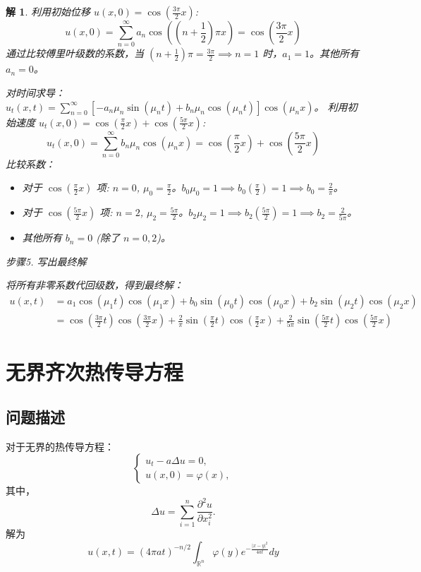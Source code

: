 \documentclass[12pt,a4paper]{article}
\numberwithin{subsection}{section}
\numberwithin{subsubsection}{subsection}
\theoremstyle{plain}
\newtheorem{solution}{解}[subsection]
\theoremstyle{definition}
\theoremstyle{remark}
\begin{document}
\begin{solution}
		\noindent
		利用初始位移 $u(x,0) = \cos(\frac{3\pi}{2}x)$:
		\[ u(x,0) = \sum_{n=0}^\infty a_n \cos\left((n+\frac{1}{2})\pi x\right) = \cos\left(\frac{3\pi}{2}x\right) \]
		通过比较傅里叶级数的系数，当 $(n+\frac{1}{2})\pi = \frac{3\pi}{2} \implies n=1$ 时，$a_1=1$。其他所有 $a_n=0$。
		
		\noindent
		对时间求导：$u_t(x,t) = \sum_{n=0}^\infty \left[-a_n\mu_n \sin(\mu_n t) + b_n\mu_n \cos(\mu_n t)\right] \cos(\mu_n x)$。
		利用初始速度 $u_t(x,0) = \cos(\frac{\pi}{2}x) + \cos(\frac{5\pi}{2}x)$:
		\[ u_t(x,0) = \sum_{n=0}^\infty b_n\mu_n \cos(\mu_n x) = \cos\left(\frac{\pi}{2}x\right) + \cos\left(\frac{5\pi}{2}x\right) \]
		比较系数：
		\begin{itemize}
			\item 对于 $\cos(\frac{\pi}{2}x)$ 项: $n=0$, $\mu_0=\frac{\pi}{2}$。$b_0\mu_0 = 1 \implies b_0\left(\frac{\pi}{2}\right)=1 \implies b_0 = \frac{2}{\pi}$。
			\item 对于 $\cos(\frac{5\pi}{2}x)$ 项: $n=2$, $\mu_2=\frac{5\pi}{2}$。$b_2\mu_2 = 1 \implies b_2\left(\frac{5\pi}{2}\right)=1 \implies b_2 = \frac{2}{5\pi}$。
			\item 其他所有 $b_n=0$ (除了 $n=0,2$)。
		\end{itemize}
		
	步骤5. 写出最终解
		
		\noindent
		将所有非零系数代回级数，得到最终解：
		\begin{align*}
			u(x,t) &= a_1\cos(\mu_1 t)\cos(\mu_1 x) + b_0\sin(\mu_0 t)\cos(\mu_0 x) + b_2\sin(\mu_2 t)\cos(\mu_2 x) \\
			&= \cos\left(\frac{3\pi}{2}t\right)\cos\left(\frac{3\pi}{2}x\right) + \frac{2}{\pi}\sin\left(\frac{\pi}{2}t\right)\cos\left(\frac{\pi}{2}x\right) + \frac{2}{5\pi}\sin\left(\frac{5\pi}{2}t\right)\cos\left(\frac{5\pi}{2}x\right)
		\end{align*}
	\end{solution}
	
		\newpage
	\section{无界齐次热传导方程}
	\subsection{问题描述}
	对于无界的热传导方程：
	\begin{equation}
		\begin{cases}\label{wujierechuandao}
			u_t -a\Delta u = 0, \\
			u(x, 0) = \varphi(x),
		\end{cases}
	\end{equation}
	其中，
	\begin{equation}
		\Delta u = \sum_{i=1}^n \frac{\partial^2 u}{\partial x_i^2}.
	\end{equation}
	解为
	\begin{equation}
	u(x, t) = (4\pi a t)^{-n/2} \int_{\mathbb{R}^n} \varphi(y) e^{-\frac{|x - y|^2}{4a t}} dy
\end{equation}
	
\end{document}
